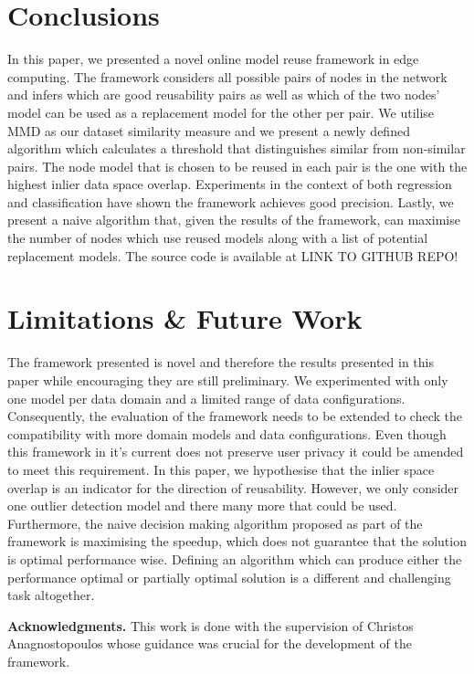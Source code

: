 \documentclass{mpaper}
\begin{document}
\section{Conclusions}

In this paper, we presented a novel online model reuse framework in edge computing. The framework considers all possible pairs of nodes in the network and infers which are good reusability pairs as well as which of the two nodes' model can be used as a replacement model for the other per pair. We utilise MMD as our dataset similarity measure and we present a newly defined algorithm which calculates a threshold that distinguishes similar from non-similar pairs. The node model that is chosen to be reused in each pair is the one with the highest inlier data space overlap. Experiments in the context of both regression and classification have shown the framework achieves good precision. Lastly, we present a naive algorithm that, given the results of the framework, can maximise the number of nodes which use reused models along with a list of potential replacement models. The source code is available at LINK TO GITHUB REPO!

\section{Limitations \& Future Work}

The framework presented is novel and therefore the results presented in this paper while encouraging they are still preliminary. We experimented with only one model per data domain and a limited range of data configurations. Consequently, the evaluation of the framework needs to be extended to check the compatibility with more domain models and data configurations. Even though this framework in it's current does not preserve user privacy it could be amended to meet this requirement. In this paper, we hypothesise that the inlier space overlap is an indicator for the direction of reusability. However, we only consider one outlier detection model and there many more that could be used. Furthermore, the naive decision making algorithm proposed as part of the framework is maximising the speedup, which does not guarantee that the solution is optimal performance wise. Defining an algorithm which can produce either the performance optimal or partially optimal solution is a different and challenging task altogether.  

\vskip8pt \noindent
{\bf Acknowledgments.}
This work is done with the supervision of Christos Anagnostopoulos whose guidance was crucial for the development of the framework. 
\end{document}
